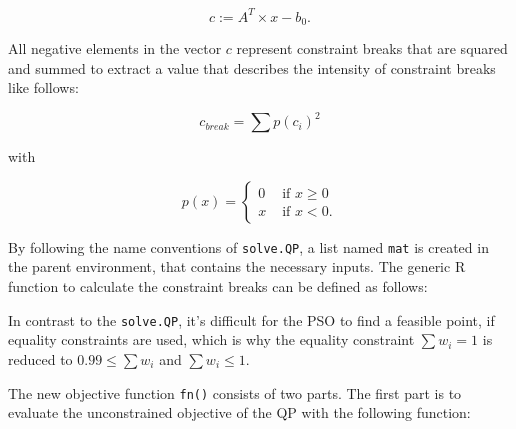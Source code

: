 \documentclass[
  oneside, a4paper, 12pt, openany]{book}
\newenvironment{Shaded}{\begin{snugshade}}{\end{snugshade}}
\newcommand{\ControlFlowTok}[1]{\textcolor[rgb]{0.13,0.29,0.53}{\textbf{#1}}}
\newcommand{\DecValTok}[1]{\textcolor[rgb]{0.00,0.00,0.81}{#1}}
\newcommand{\FloatTok}[1]{\textcolor[rgb]{0.00,0.00,0.81}{#1}}
\newcommand{\FunctionTok}[1]{\textcolor[rgb]{0.00,0.00,0.00}{#1}}
\newcommand{\NormalTok}[1]{#1}
\newcommand{\OtherTok}[1]{\textcolor[rgb]{0.56,0.35,0.01}{#1}}
\newcommand{\SpecialCharTok}[1]{\textcolor[rgb]{0.00,0.00,0.00}{#1}}
\theoremstyle{definition}
\theoremstyle{definition}
\theoremstyle{definition}
\theoremstyle{definition}
\theoremstyle{remark}
\begin{document}
\[
  c := A^T \times x - b_0.
\]

All negative elements in the vector \(c\) represent constraint breaks that are squared and summed to extract a value that describes the intensity of constraint breaks like follows:

\[
  c_{break} = \sum p(c_i)^2
\]

with

\[
 p(x) =   \begin{cases}
  0 &\text{ if }x \geq 0\\
  x &\text{ if }x < 0.
  \end{cases}
\]

By following the name conventions of \texttt{solve.QP}, a list named \texttt{mat} is created in the parent environment, that contains the necessary inputs. The generic R function to calculate the constraint breaks can be defined as follows:

\vspace{0.1cm}\fontsize{11}{12}\selectfont

\begin{Shaded}
\end{Shaded}

\normalsize\vspace{0.1cm}

In contrast to the \texttt{solve.QP}, it's difficult for the PSO to find a feasible point, if equality constraints are used, which is why the equality constraint \(\textstyle\sum w_i = 1\) is reduced to \(0.99 \leq \textstyle\sum w_i\) and \(\textstyle\sum w_i \leq 1\).

The new objective function \texttt{fn()} consists of two parts. The first part is to evaluate the unconstrained objective of the QP with the following function:

\vspace{0.1cm}\fontsize{11}{12}\selectfont

\begin{Shaded}
\end{Shaded}
\end{document}
